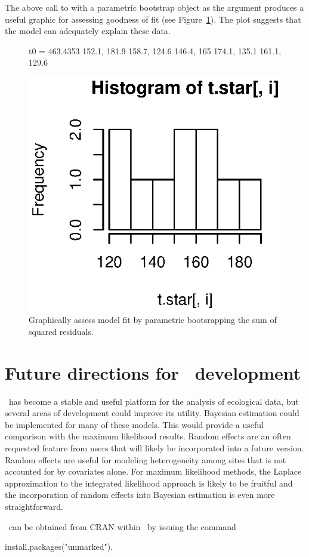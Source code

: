 \documentclass[article,shortnames]{jss}
\newcommand{\um}{\pkg{unmarked}}
\newcommand{\rlang}{\proglang{R}}
\begin{document}
The above call to  with a parametric bootstrap object as
the argument produces a useful graphic for assessing goodness of fit
(see Figure~\ref{fig:pb}).  The plot suggests that the model can adequately
explain these data.

\begin{figure}
  \centering
\begin{Schunk}
\begin{Soutput}
t0 = 463.4353 
152.1, 181.9
158.7, 124.6
146.4, 165
174.1, 135.1
161.1, 129.6
\end{Soutput}
\end{Schunk}
\includegraphics{unmarked-027}
\caption{Graphically assess model fit by parametric bootsrapping
  the sum of squared residuals.}
\label{fig:pb}
\end{figure}

\section[Future directions for unmarked development]{Future directions for \um\ development}
\label{sec:future-direct-unmark}

\um\ has become a stable and useful platform for the analysis of
ecological data, but 
several areas of development could improve its utility.
Bayesian estimation could be implemented for many
of these models.  This would provide a useful comparison with the
maximum likelihood results.  Random effects are an often requested
feature from users that will likely be incorporated into a future
version.  Random effects are useful for modeling heterogeneity among
sites that is not accounted for by covariates alone.  For maximum
likelihood methods, the Laplace approximation to the integrated
likelihood approach is likely to be fruitful and the incorporation of
random effects into Bayesian estimation is even more straightforward.

\um\ can be obtained from
CRAN within \rlang\ by issuing the command \\
\begin{Code}
install.packages("unmarked").
\end{Code}

%

\end{document}
